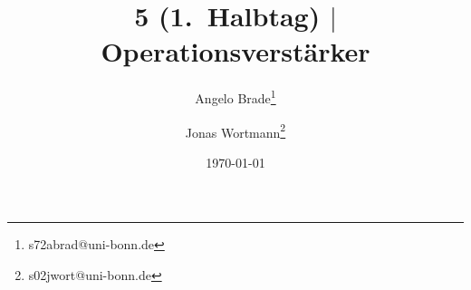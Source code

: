 \documentclass[a4paper,10pt]{article}
\numberwithin{equation}{section}
\begin{document}

\begin{titlepage}
        \title{5 (1.\ Halbtag) $|$ Operationsverstärker}
        \author[1]{Angelo Brade\thanks{s72abrad@uni-bonn.de}}
        \author[1]{Jonas Wortmann\thanks{s02jwort@uni-bonn.de}}
        \date{\today}
\end{titlepage}

\maketitle
{}


\newpage


\fancyhead[R]{\leftmark}
\fancyhead[L]{\thepage}
\fancyfoot[C]{}

\tableofcontents


\clearpage


\end{document}
